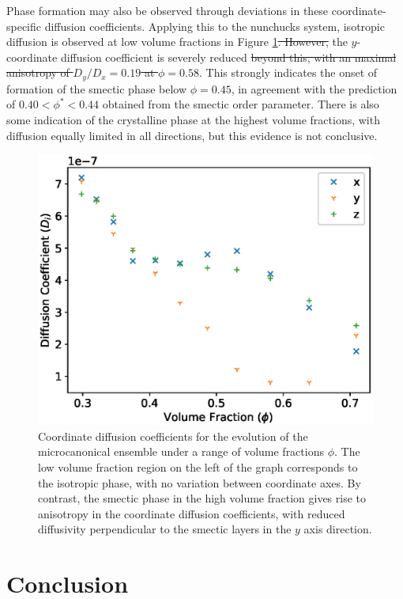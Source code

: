 \documentclass[11pt, a4paper]{article} %
\providecommand{\DIFadd}[1]{{\protect\color{blue}\uwave{#1}}} %
\providecommand{\DIFdel}[1]{{\protect\color{red}\sout{#1}}}                      %
\providecommand{\DIFaddbegin}{} %
\providecommand{\DIFaddend}{} %
\providecommand{\DIFdelbegin}{} %
\providecommand{\DIFdelend}{} %
\begin{document}
Phase formation may also be observed through deviations in these coordinate-specific diffusion coefficients. Applying this to the nunchucks system, isotropic diffusion is observed at low volume fractions in Figure \ref{fig:nun_diff_Dcoeff}\DIFdelbegin \DIFdel{. However, }\DIFdelend \DIFaddbegin \DIFadd{, but }\DIFaddend the $y$-coordinate diffusion coefficient is severely reduced \DIFdelbegin \DIFdel{beyond this, with an maximal anisotropy of $D_{y}/D_{x} = 0.19$ at $\phi = 0.58$}\DIFdelend \DIFaddbegin \DIFadd{before this}\DIFaddend . This strongly indicates the onset of formation of the smectic phase below $\phi = 0.45$, in agreement with the prediction of $ 0.40<\phi^{*}<0.44$ obtained from the smectic order parameter. There is also some indication of the crystalline phase at the highest volume fractions, with diffusion equally limited in all directions, but this evidence is not conclusive.

\begin{figure} [h!]
	\centering
	\includegraphics[width=0.7\linewidth]{Figures/nun_diff_Dcoeff}
	\caption{Coordinate diffusion coefficients for the evolution of the microcanonical ensemble under a range of volume fractions $\phi$. The low volume fraction region on the left of the graph corresponds to the isotropic phase, with no variation between coordinate axes. By contrast, the smectic phase in the high volume fraction gives rise to anisotropy in the coordinate diffusion coefficients, with reduced diffusivity perpendicular to the smectic layers in the $y$ axis direction.}
	\label{fig:nun_diff_Dcoeff}
\end{figure}  %


\section{Conclusion}
\end{document}
